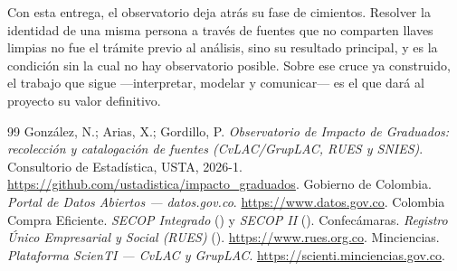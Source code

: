 Con esta entrega, el observatorio deja atrás su fase de cimientos. Resolver la identidad de una misma persona a través de fuentes que no comparten llaves limpias no fue el trámite previo al análisis, sino su resultado principal, y es la condición sin la cual no hay observatorio posible. Sobre ese cruce ya construido, el trabajo que sigue ---interpretar, modelar y comunicar--- es el que dará al proyecto su valor definitivo.

\begin{thebibliography}{99}\setlength\itemsep{1.5pt}
 González, N.; Arias, X.; Gordillo, P. \emph{Observatorio de Impacto de Graduados: recolección y catalogación de fuentes (CvLAC/GrupLAC, RUES y SNIES)}. Consultorio de Estadística, USTA, 2026-1. \url{https://github.com/ustadistica/impacto_graduados}.
 Gobierno de Colombia. \emph{Portal de Datos Abiertos --- datos.gov.co}. \url{https://www.datos.gov.co}.
 Colombia Compra Eficiente. \emph{SECOP Integrado} () y \emph{SECOP II} ().
 Confecámaras. \emph{Registro Único Empresarial y Social (RUES)} (). \url{https://www.rues.org.co}.
 Minciencias. \emph{Plataforma ScienTI --- CvLAC y GrupLAC}. \url{https://scienti.minciencias.gov.co}.
\end{thebibliography}
